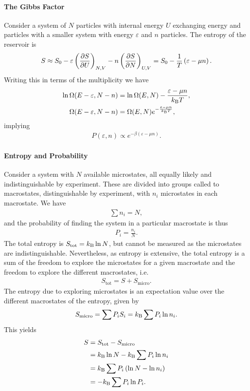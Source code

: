 \paragraph{The Gibbs Factor}
Consider a system of $N$ particles with internal energy $U$ exchanging energy and particles with a smaller system with energy $\varepsilon$ and $n$ particles. The entropy of the reservoir is
\begin{align*}
	S \approx S_{0} - \varepsilon\left(\pdv{S}{U}\right)_{N, V} - n\left(\pdv{S}{N}\right)_{U, V} = S_{0} - \frac{1}{T}\left(\varepsilon - \mu n\right).
\end{align*}
Writing this in terms of the multiplicity we have
\begin{align*}
	\ln{\Omega(E - \varepsilon, N - n)} &= \ln{\Omega(E, N)} - \frac{\varepsilon - \mu n}{k_{\text{B}} T}, \\
	\Omega(E - \varepsilon, N - n)      &= \Omega(E, N)e^{-\frac{\varepsilon - \mu n}{k_{\text{B}} T}},
\end{align*}
implying
\begin{align*}
	P(\varepsilon, n) \propto e^{-\beta\left(\varepsilon - \mu n\right)}.
\end{align*}

\paragraph{Entropy and Probability}
Consider a system with $N$ available microstates, all equally likely and indistinguishable by experiment. These are divided into groups called to macrostates, distinguishable by experiment, with $n_{i}$ microstates in each macrostate. We have
\begin{align*}
	\sum n_{i} = N,
\end{align*}
and the probability of finding the system in a particular macrostate is thus
\begin{align*}
	P_{i} = \frac{n_{i}}{N}.
\end{align*}
The total entropy is $S_{\text{tot}} = k_{\text{B}}\ln{N}$, but cannot be measured as the microstates are indistinguishable. Nevertheless, as entropy is extensive, the total entropy is a sum of the freedom to explore the microstates for a given macrostate and the freedom to explore the different macrostates, i.e.
\begin{align*}
	S_{\text{tot}} = S + S_{\text{micro}}.
\end{align*}
The entropy due to exploring microstates is an expectation value over the different macrostates of the entropy, given by
\begin{align*}
	S_{\text{micro}} = \sum P_{i}S_{i} = k_{\text{B}}\sum P_{i}\ln{n_{i}}.
\end{align*}
This yields
\begin{align*}
	S &= S_{\text{tot}} - S_{\text{micro}} \\
	  &= k_{\text{B}}\ln{N} - k_{\text{B}}\sum P_{i}\ln{n_{i}} \\
	  &= k_{\text{B}}\sum P_{i}\left(\ln{N} - \ln{n_{i}}\right) \\
	  &= -k_{\text{B}}\sum P_{i}\ln{P_{i}}.
\end{align*}